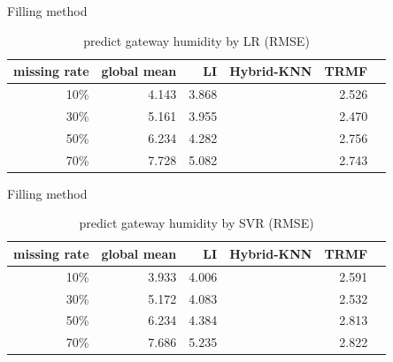 \begin{table} [htbp]
\centering
\caption{predict gateway humidity by LR (RMSE) }
\label{table: LR}
   Filling method
\begin{tabular}{ r | r r r r r}
        missing rate&global mean     &LI   &Hybrid-KNN &TRMF\\ \hline
        10\%    &4.143&3.868&&2.526\\
        30\%    &5.161&3.955&&2.470\\
        50\%    &6.234&4.282&&2.756\\
        70\%   &7.728&5.082&&2.743\\
  
\end{tabular}
\end{table}

\begin{table} [htbp]
\centering
\caption{predict gateway humidity by SVR (RMSE) }
\label{table: SVR}
   Filling method
\begin{tabular}{ r | r r r r r}
        missing rate&global mean     &LI   &Hybrid-KNN &TRMF\\ \hline
        10\%    &3.933 &4.006&&2.591\\
        30\%    &5.172&4.083&&2.532\\
        50\%    &6.234&4.384&&2.813\\
        70\%   &7.686&5.235&&2.822\\
  
\end{tabular}
\end{table}
